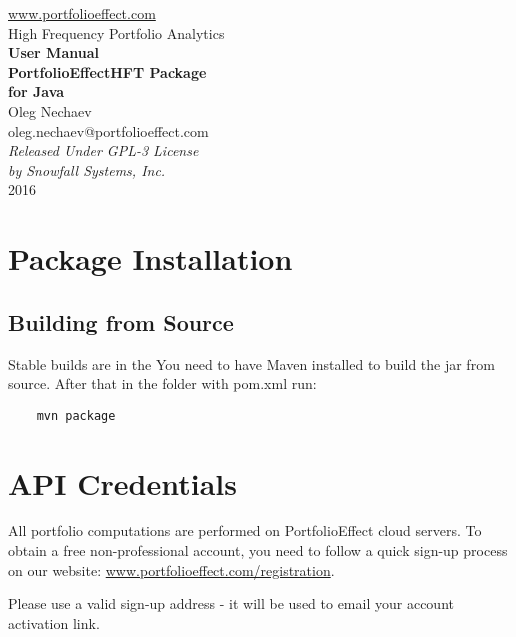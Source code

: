 \documentclass[letterpaper]{report}
\newcounter{N}
\begin{document}
\begin{titlepage}
\begin{center}
\vspace{5cm}
{\href{https://www.portfolioeffect.com}{www.portfolioeffect.com} \\ High
  Frequency Portfolio Analytics\\}
\vspace{8cm}
{\Large \bfseries User Manual \\}
\vspace{0.3cm}
{\Huge\bfseries PortfolioEffectHFT Package \\ for Java\\ }
  \vspace{1.5cm}
{Oleg Nechaev \\ oleg.nechaev@portfolioeffect.com} \\[14pt]
  \vfill
\emph{{Released Under GPL-3 License\\ by Snowfall Systems,
  Inc.}}\\[2cm]
{2016}
\end{center}
\end{titlepage}

\cleardoublepage
{}
{}
\renewcommand{\bibname}{Contents}
\tableofcontents

%

\chapter{Package Installation}
  
  \section{Building from Source}
Stable builds are in the You need to have Maven installed to build the jar from source. After that in the folder with pom.xml run:
    \begin{lstlisting}
    mvn package
      \end{lstlisting}


\chapter{API Credentials}
All portfolio computations are performed on PortfolioEffect cloud servers.
To obtain a free non-professional account, you need to follow a quick sign-up
process on our website:
  \href{https://www.portfolioeffect.com/registration}{www.portfolioeffect.com/registration}.\par
Please use a valid sign-up address - it will be used to email your
account activation link.
\end{document}
